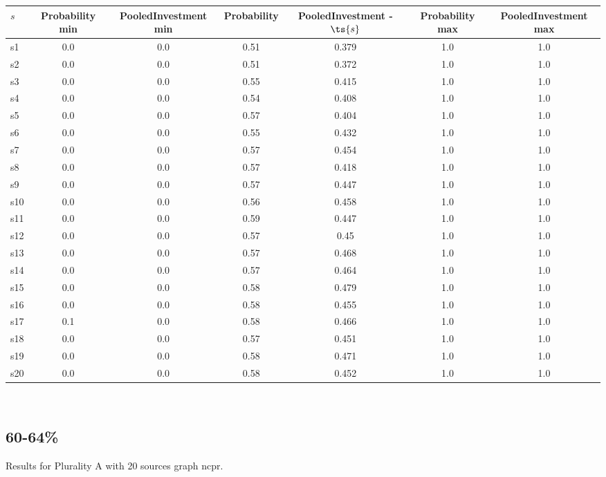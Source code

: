 \documentclass{article}
\begin{document}
\noindent\begin{tabular}{|l|c|c|c|c|c|c|}
\hline
$s$& Probability min & PooledInvestment min & Probability & PooledInvestment - $\ts{s}$ & Probability max & PooledInvestment max\\
\hline
s1 &0.0 & 0.0 & 0.51 & 0.379 & 1.0 & 1.0\\
\hline
s2 &0.0 & 0.0 & 0.51 & 0.372 & 1.0 & 1.0\\
\hline
s3 &0.0 & 0.0 & 0.55 & 0.415 & 1.0 & 1.0\\
\hline
s4 &0.0 & 0.0 & 0.54 & 0.408 & 1.0 & 1.0\\
\hline
s5 &0.0 & 0.0 & 0.57 & 0.404 & 1.0 & 1.0\\
\hline
s6 &0.0 & 0.0 & 0.55 & 0.432 & 1.0 & 1.0\\
\hline
s7 &0.0 & 0.0 & 0.57 & 0.454 & 1.0 & 1.0\\
\hline
s8 &0.0 & 0.0 & 0.57 & 0.418 & 1.0 & 1.0\\
\hline
s9 &0.0 & 0.0 & 0.57 & 0.447 & 1.0 & 1.0\\
\hline
s10 &0.0 & 0.0 & 0.56 & 0.458 & 1.0 & 1.0\\
\hline
s11 &0.0 & 0.0 & 0.59 & 0.447 & 1.0 & 1.0\\
\hline
s12 &0.0 & 0.0 & 0.57 & 0.45 & 1.0 & 1.0\\
\hline
s13 &0.0 & 0.0 & 0.57 & 0.468 & 1.0 & 1.0\\
\hline
s14 &0.0 & 0.0 & 0.57 & 0.464 & 1.0 & 1.0\\
\hline
s15 &0.0 & 0.0 & 0.58 & 0.479 & 1.0 & 1.0\\
\hline
s16 &0.0 & 0.0 & 0.58 & 0.455 & 1.0 & 1.0\\
\hline
s17 &0.1 & 0.0 & 0.58 & 0.466 & 1.0 & 1.0\\
\hline
s18 &0.0 & 0.0 & 0.57 & 0.451 & 1.0 & 1.0\\
\hline
s19 &0.0 & 0.0 & 0.58 & 0.471 & 1.0 & 1.0\\
\hline
s20 &0.0 & 0.0 & 0.58 & 0.452 & 1.0 & 1.0\\
\hline
\end{tabular}\\

\newpage

\subsection{60-64\%}

\noindent Results for Plurality A with 20 sources graph ncpr.
\end{document}

